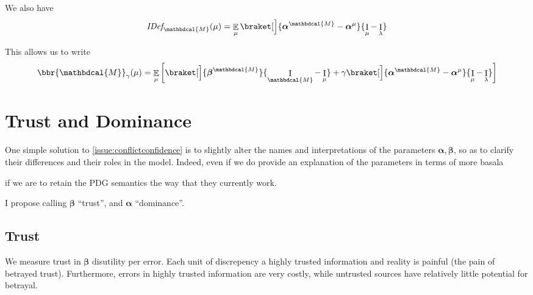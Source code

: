 \documentclass[twoside]{article} %
\theoremstyle{plain}
\theoremstyle{definition}
\DeclareMathOperator{\I}{\mathrm{I}} %
\DeclareMathOperator*{\Ex}{\mathbb{E}} %
\newcommand{\balpha}{\boldsymbol\alpha}
\newcommand{\bbeta}{\boldsymbol\beta}
\newcommand{\dg}[1]{\mathbdcal{#1}}
\newcommand{\IDef}[1]{\mathit{IDef}_{\!#1}}
\begin{document}
    
    We also have
    \begin{align*}
        \IDef{\dg M}(\mu) = 
        \Ex_{\mu}\braket[\Big]{\balpha^\dg M - \balpha^{\mu}} {\I_\mu - \I_\lambda}
    \end{align*}
    
    This allows us to write
    \begin{align*}
        \bbr{\dg M}_\gamma(\mu) = 
        \Ex_{\mu}\left[
            \braket[\Big]{\bbeta^{\dg M}}{\I_{\dg M}- \I_{\mu}}
            + \gamma
            \braket[\Big]{\balpha^{\dg M} - \balpha^{\mu}} {\I_\mu - \I_\lambda}
        \right]
    \end{align*}




    \section{Trust and Dominance}\label{sec:trust-dominance}
    One simple solution to \cref{issue:conflictconfidence} is to slightly alter the names and interpretations of the parameters $\balpha, \bbeta$, so as to clarify their differences and their roles in the model.
    Indeed, even if we do provide an explanation of the parameters in terms of more basala
     
    if we are to retain the PDG semantics the way that they currently work.

    I propose calling $\bbeta$ ``trust'', and $\balpha$ ``dominance''.




    \subsection{Trust}
    We measure trust in $\bbeta$ disutility per error.
    Each unit of discrepency a highly trusted information and reality is painful (the pain of betrayed trust).
    Furthermore, errors in highly trusted information are very costly, while untrusted sources have relatively little potential for betrayal.
\end{document}
